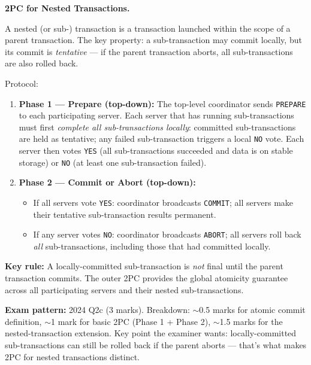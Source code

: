 \documentclass[12pt,a4paper]{article}
\begin{document}
\begin{solbox}
\medskip
\textbf{2PC for Nested Transactions.}

A nested (or sub-) transaction is a transaction launched within the scope of a parent
transaction. The key property: a sub-transaction may commit locally, but its commit
is \emph{tentative} — if the parent transaction aborts, all sub-transactions are also
rolled back.

Protocol:
\begin{enumerate}
  \item \textbf{Phase 1 — Prepare (top-down):}
        The top-level coordinator sends \texttt{PREPARE} to each participating server.
        Each server that has running sub-transactions must first \emph{complete all
        sub-transactions locally}: committed sub-transactions are held as tentative;
        any failed sub-transaction triggers a local \texttt{NO} vote.
        Each server then votes \texttt{YES} (all sub-transactions succeeded and data is
        on stable storage) or \texttt{NO} (at least one sub-transaction failed).

  \item \textbf{Phase 2 — Commit or Abort (top-down):}
        \begin{itemize}
          \item If all servers vote \texttt{YES}: coordinator broadcasts \texttt{COMMIT};
                all servers make their tentative sub-transaction results permanent.
          \item If any server votes \texttt{NO}: coordinator broadcasts \texttt{ABORT};
                all servers roll back \emph{all} sub-transactions, including those that had
                committed locally.
        \end{itemize}
\end{enumerate}

\textbf{Key rule:} A locally-committed sub-transaction is \emph{not} final until the
parent transaction commits. The outer 2PC provides the global atomicity guarantee across
all participating servers and their nested sub-transactions.
\end{solbox}

\begin{notesbox}
\textbf{Exam pattern:} 2024 Q2c (3 marks).
Breakdown: $\sim$0.5 marks for atomic commit definition, $\sim$1 mark for basic 2PC
(Phase 1 + Phase 2), $\sim$1.5 marks for the nested-transaction extension.
Key point the examiner wants: locally-committed sub-transactions can still be rolled
back if the parent aborts — that's what makes 2PC for nested transactions distinct.
\end{notesbox}
\end{document}
